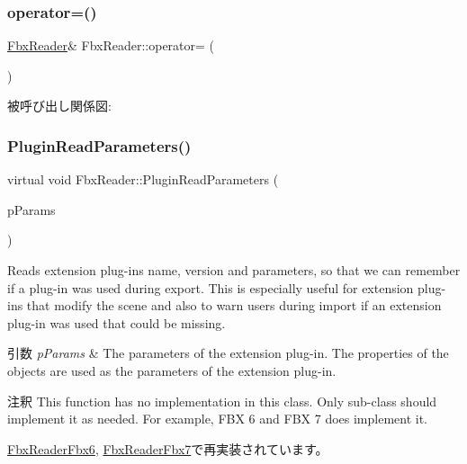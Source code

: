\subsubsection{\texorpdfstring{operator=()}{operator=()}}
{\footnotesize\ttfamily \hyperlink{class_fbx_reader}{Fbx\+Reader}\& Fbx\+Reader\+::operator= (\begin{DoxyParamCaption}\item[{\hyperlink{class_fbx_reader}{Fbx\+Reader} const \&}]{ }\end{DoxyParamCaption})\hspace{0.3cm}{\ttfamily [protected]}}

被呼び出し関係図\+:
\mbox{\label{class_fbx_reader_aa026634b699bea0df1b43850c08bb63a}} 
\subsubsection{\texorpdfstring{Plugin\+Read\+Parameters()}{PluginReadParameters()}}
{\footnotesize\ttfamily virtual void Fbx\+Reader\+::\+Plugin\+Read\+Parameters (\begin{DoxyParamCaption}\item[{\hyperlink{class_fbx_object}{Fbx\+Object} \&}]{p\+Params }\end{DoxyParamCaption})\hspace{0.3cm}{\ttfamily [virtual]}}

Reads extension plug-\/ins name, version and parameters, so that we can remember if a plug-\/in was used during export. This is especially useful for extension plug-\/ins that modify the scene and also to warn users during import if an extension plug-\/in was used that could be missing. 
\begin{DoxyParams}{引数}
{\em p\+Params} & The parameters of the extension plug-\/in. The properties of the objects are used as the parameters of the extension plug-\/in. \\
\hline
\end{DoxyParams}
\begin{DoxyRemark}{注釈}
This function has no implementation in this class. Only sub-\/class should implement it as needed. For example, F\+BX 6 and F\+BX 7 does implement it. 
\end{DoxyRemark}


\hyperlink{class_fbx_reader_fbx6_a1a3544b766bd03dc4b1141ba4f93b03f}{Fbx\+Reader\+Fbx6}, \hyperlink{class_fbx_reader_fbx7_a60ceb6537da84cfd6540adde212b7b8f}{Fbx\+Reader\+Fbx7}で再実装されています。


